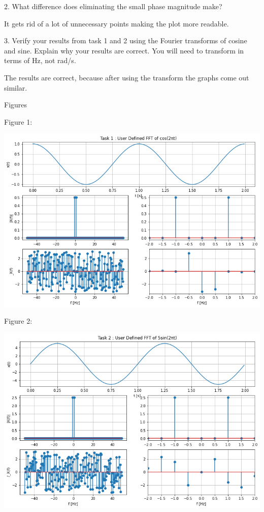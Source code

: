 \documentclass[nobib]{MSword}
\begin{document}
2. What difference does eliminating the small phase magnitude make?

It gets rid of a lot of unnecessary points making the plot more readable.

3. Verify your results from task 1 and 2 using the Fourier transforms of cosine and sine. Explain why your results are correct. You will need to transform in terms of Hz, not rad/s.

The results are correct, because after using the transform the graphs come out similar.

\begin{center}
    Figures
\end{center}

Figure 1:

\includegraphics[scale = 0.6]
{txt/Lab9Fig1.png}

Figure 2:

\includegraphics[scale = 0.6]
{txt/Lab9Fig2.png}
\end{document}
